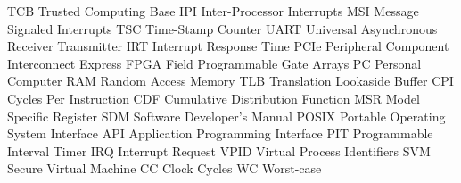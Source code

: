  {TCB} {Trusted Computing Base}
 {IPI} {Inter-Processor Interrupts}
 {MSI} {Message Signaled Interrupts}
 {TSC} {Time-Stamp Counter}
 {UART} {Universal Asynchronous Receiver Transmitter}
 {IRT} {Interrupt Response Time}
 {PCIe} {Peripheral Component Interconnect Express}
 {FPGA} {Field Programmable Gate Arrays}
 {PC} {Personal Computer}
 {RAM} {Random Access Memory}
 {TLB} {Translation Lookaside Buffer}
 {CPI} {Cycles Per Instruction}
 {CDF} {Cumulative Distribution Function}
 {MSR} {Model Specific Register}
 {SDM} {Software Developer's Manual}
 {POSIX} {Portable Operating System Interface}
 {API} {Application Programming Interface}
 {PIT} {Programmable Interval Timer}
 {IRQ} {Interrupt Request}
 {VPID} {Virtual Process Identifiers}
 {SVM} {Secure Virtual Machine}
 {CC} {Clock Cycles}
 {WC} {Worst-case}
